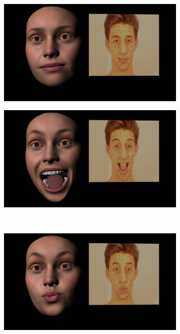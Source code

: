 \begin{figure}
        \centering
        \begin{subfigure}[t]{0.7\textwidth}
                \includegraphics[width=\textwidth]{img/results/Emily_Maya_clean_video_300}
        \end{subfigure}
        \begin{subfigure}[t]{0.7\textwidth}
                \includegraphics[width=\textwidth]{img/results/Emily_Maya_clean_video_1187}
        \end{subfigure}\\
        \begin{subfigure}[t]{0.7\textwidth}
                \includegraphics[width=\textwidth]{img/results/Emily_Maya_clean_video_1544}

\end{subfigure}
\end{figure}
